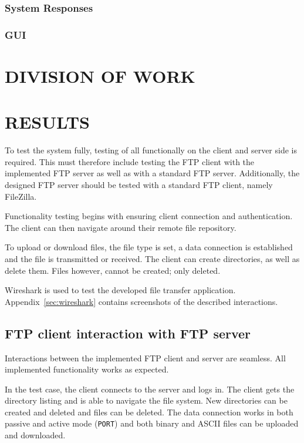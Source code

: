 \documentclass[10pt,twocolumn]{witseiepaper}
\begin{document}
\subsubsection*{System Responses}
\subsubsection*{GUI}




\section{DIVISION OF WORK}

\section{RESULTS}\label{results}

To test the system fully, testing of all functionally on the client and server side is required. This must therefore include testing the FTP client with the implemented FTP server as well as with a standard FTP server. Additionally, the designed FTP server should be tested with a standard FTP client, namely FileZilla. 

Functionality testing begins with ensuring client connection and authentication. The client can then navigate around their remote file repository. 

To upload or download files, the file type is set, a data connection is established and the file is transmitted or received. The client can create directories, as well as delete them. Files however, cannot be created;  only deleted.

Wireshark is used to test the developed file transfer application.
Appendix~\ref{sec:wireshark} contains screenshots of the described interactions. 

\subsection{FTP client interaction with FTP server}

Interactions between the implemented FTP client and server are seamless. All implemented functionality works as expected.

In the test case, the client connects to the server and logs in. The client gets the directory listing and is able to navigate the file system. New directories can be created and deleted and files can be deleted. The data connection works in both passive and active mode (\texttt{PORT}) and both binary and ASCII files can be uploaded and downloaded.
 
\end{document}
